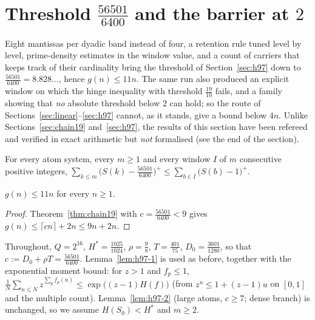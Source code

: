 \section{Threshold $\tfrac{56501}{6400}$ and the barrier at $2$}\label{sec:h883}

Eight mantissas per dyadic band instead of four, a retention rule tuned level by level, prime-density estimates in
the window value, and a count of carriers that keeps track of their cardinality bring the threshold of
Section~\ref{sec:h97} down to $\tfrac{56501}{6400}=8.828\ldots$, hence $g(n)\le11n$. The same run also produced an
explicit window on which the hinge inequality with threshold $\tfrac{19}{10}$ fails, and a family showing that
\emph{no} absolute threshold below $2$ can hold; so the route of Sections~\ref{sec:linear}--\ref{sec:h97} cannot,
as it stands, give a bound below $4n$. Unlike Sections~\ref{sec:chain19} and~\ref{sec:h97}, the results of this
section have been refereed and verified in exact arithmetic but \emph{not} formalised (see the end of the section).

\begin{theorem}\label{thm:h883}
For every atom system, every $m\ge1$ and every window $I$ of $m$ consecutive positive integers,
$\sum_{k\le m}\bigl(S(k)-\tfrac{56501}{6400}\bigr)^+\le\sum_{b\in I}\bigl(S(b)-1\bigr)^+$.
\end{theorem}

\begin{corollary}\label{cor:11n}
$g(n)\le11n$ for every $n\ge1$.
\end{corollary}
\begin{proof}
Theorem~\ref{thm:chain19} with $c=\tfrac{56501}{6400}<9$ gives $g(n)\le\lceil cn\rceil+2n\le9n+2n$.
\end{proof}

Throughout, $Q=2^{16}$, $H^*=\tfrac{1025}{1024}$, $\rho=\tfrac98$, $T=\tfrac{401}{75}$, $D_0=\tfrac{3601}{1280}$,
so that $c:=D_0+\rho T=\tfrac{56501}{6400}$. Lemma~\ref{lem:h97-1} is used as before, together with the exponential
moment bound: for $z>1$ and $f_p\le1$, $\frac1N\sum_{n\le N}z^{\sum_pf_p(n)}\le\exp\bigl((z-1)H(f)\bigr)$ (from
$z^u\le1+(z-1)u$ on $[0,1]$ and the multiple count). Lemma~\ref{lem:h97-2} (large atoms, $c\ge7$; dense branch) is
unchanged, so we assume $H(S_0)<H^*$ and $m\ge2$.

